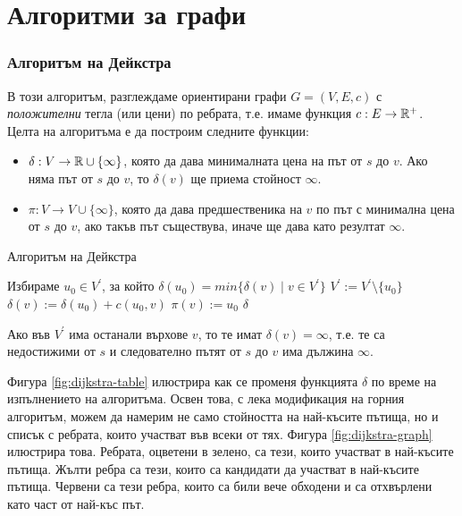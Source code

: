 \chapter {Алгоритми за графи}

\subsection{Алгоритъм на Дейкстра}

В този алгоритъм, разглеждаме ориентирани графи $G = (V,E,c)$ с {\em положителни} тегла (или цени) по ребрата, т.е. 
имаме функция $c:E\to\mathbb{R}^+$. 
Целта на алгоритъма е да построим следните функции:
\begin{itemize}
\item 
  $\delta: V\to\mathbb{R}\cup\{\infty\}$, 
  която да дава минималната цена на път от $s$ до $v$. Ако няма път от $s$ до $v$, то $\delta(v)$
  ще приема стойност $\infty$.
\item
  $\pi:V\to V\cup\{\infty\}$, която да дава предшественика на $v$ по път с минимална цена от $s$ до $v$,
  ако такъв път съществува, иначе ще дава като резултат $\infty$.
\end{itemize}

\begin{algorithm}
\caption{Алгоритъм на Дейкстра}
\label{alg:dijkstra}

\begin{algorithmic}[1]
  \STATE {}
  
  \STATE Избираме $u_0\in V^\prime$, за който $ \delta(u_0) = min\{\delta(v)\mid v\in V^\prime\} $
  \STATE $V^\prime := V^\prime\setminus\{u_0\}$
  \STATE $\delta(v):= \delta(u_0)+c(u_0,v)$
  \STATE $\pi(v) := u_0$
  \ENDIF
  \ENDFOR
  \ENDWHILE
  \RETURN $\delta$
\end{algorithmic}
\end{algorithm}

Ако във $V^\prime$ има останали върхове $v$, то те имат $\delta(v) = \infty$, т.е.
те са недостижими от $s$ и следователно пътят от $s$ до $v$ има дължина $\infty$.

Фигура \ref{fig:dijkstra-table} илюстрира как се променя функцията $\delta$ по време на изпълнението на алгоритъма.
Освен това, с лека модификация на горния алгоритъм, можем да намерим не само стойността на най-късите пътища, но
и списък с ребрата, които участват във всеки от тях. Фигура \ref{fig:dijkstra-graph} илюстрира това.
Ребрата, оцветени в зелено, са тези, които участват в най-късите пътища.
Жълти ребра са тези, които са кандидати да участват в най-късите пътища.
Червени са тези ребра, които са били вече обходени и са отхвърлени като част от най-къс път.

